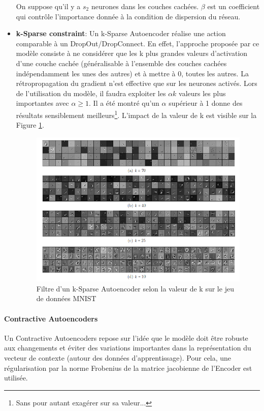 \begin{itemize}
    \noindent On suppose qu'il y a $s_2$ neurones dans les couches cachées. $\beta$ est un coefficient qui contrôle l'importance donnée à la condition de dispersion du réseau.

    \item \textbf{k-Sparse constraint}\cite{ksparseauto}: Un k-Sparse Autoencoder réalise une action comparable à un DropOut/DropConnect. En effet, l'approche proposée par ce modèle consiste à ne considérer que les k plus grandes valeurs d'activation d'une couche cachée (généralisable à l'ensemble des couches cachées indépendamment les unes des autres) et à mettre à 0, toutes les autres. La rétropropagation du gradient n'est effective que sur les neurones activés. Lors de l'utilisation du modèle, il faudra exploiter les $\alpha k$ valeurs les plus importantes avec $\alpha \geq 1$. Il a été montré qu'un $\alpha$ supérieur à 1 donne des résultats sensiblement meilleurs\footnote{Sans pour autant exagérer sur sa valeur...}. L'impact de la valeur de k est visible sur la Figure \ref{ksparseauto}.

    \begin{figure}
    \centering
    \includegraphics[scale=0.4]{./tex/encoder-decoder-network/ksparse.png}
    \caption{Filtre d'un k-Sparse Autoencoder selon la valeur de k sur le jeu de données MNIST}
    \label{ksparseauto}
\end{figure}
\end{itemize}
\paragraph{Contractive Autoencoders}
Un Contractive Autoencoders \cite{contracauto} repose sur l'idée que le modèle doit être robuste aux changements et éviter des variations importantes dans la représentation du vecteur de contexte (autour des données d'apprentissage). Pour cela, une régularisation par la norme Frobenius de la matrice jacobienne de l'Encoder est utilisée.\\


